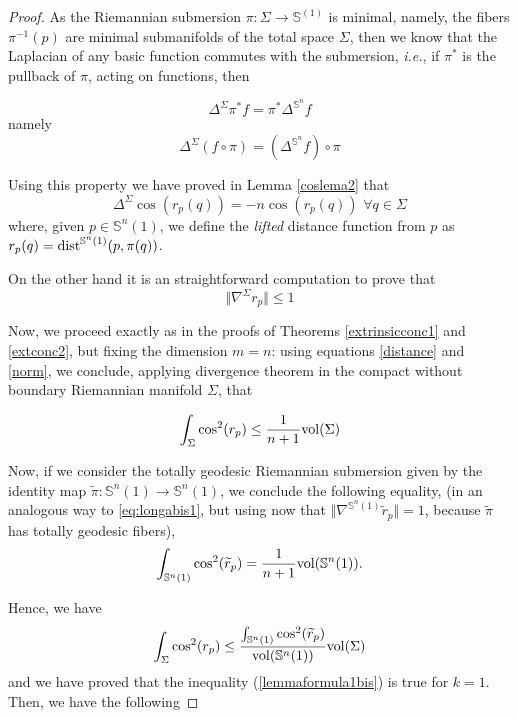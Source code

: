 \documentclass{amsart}
\theoremstyle{definition}
\theoremstyle{remark}
\newcommand{\ese}{\mathbb{S}}
\begin{document}
\begin{proof}
As the Riemannian submersion $\pi:\Sigma \rightarrow \ese^(1)$ is minimal, namely, the fibers $\pi^{-1}(p)$ are minimal submanifolds of the total space $\Sigma$, then we know that the Laplacian of any basic function commutes with the submersion, \emph{i.e.}, if $\pi^*$ is the pullback of $\pi$, acting on functions, then

$$
\Delta^\Sigma \pi^* f=\pi^*\Delta^{\mathbb{S}^n}f
$$
\noindent namely 
$$
\Delta^\Sigma( f\circ \pi)=(\Delta^{\mathbb{S}^n}f) \circ \pi
$$

\noindent Using this property we have proved in Lemma \ref{coslema2} that 
\begin{equation}\label{distance}
\Delta^\Sigma \cos(r_p(q))=-n\cos(r_p(q))\,\,\forall q \in \Sigma
\end{equation}
\noindent  where, given $p \in \ese^n(1)$, we define the {\em lifted} distance function from $p$ as $r_p(q)={\rm dist}^{\ese^n(1)}(p,\pi(q))$.

On the other hand it is an straightforward computation to prove that
\begin{equation}\label{norm}
\Vert \nabla^\Sigma r_p\Vert \leq 1
\end{equation}


Now, we proceed exactly as in the proofs of Theorems \ref{extrinsicconc1} and \ref{extconc2}, but fixing the dimension $m=n$: using equations \eqref{distance} and \eqref{norm}, we conclude, applying divergence theorem in the compact without boundary Riemannian manifold $\Sigma$, that

\begin{equation}\label{eq:longabis1}
\int_\Sigma \cos^2(r_p) \leq \frac{1}{n+1} {\rm vol}(\Sigma)
\end{equation}

Now, if we consider the totally geodesic Riemannian submersion given by the identity map $\widetilde{\pi}: \mathbb{S}^n(1) \rightarrow \mathbb{S}^n(1)$, we conclude the following equality, (in an analogous way  to \eqref{eq:longabis1}, but using now that $\Vert\nabla^{\mathbb{S}^n(1)} \widetilde{r}_p\Vert=1$, because $\widetilde{\pi}$ has totally geodesic fibers), 
\begin{equation}\label{eqcinc}
\int_{\mathbb{S}^n(1)} \cos^2(\widetilde{r}_p) = \frac{1}{n+1} {\rm vol}(\mathbb{S}^n(1)).
\end{equation}

Hence,  we have 
\begin{equation}\label{eqsisbis}
\int_\Sigma \cos^2(r_p) \leq \frac{\int_{\mathbb{S}^n(1)} \cos^2(\widetilde{r}_p)}{{\rm vol}(\mathbb{S}^n(1))} {\rm vol}(\Sigma)
\end{equation}
and we have proved that the inequality (\ref{lemmaformula1bis}) is true for $k=1$.
\noindent Then, we have the following 


\end{proof}
\end{document}
